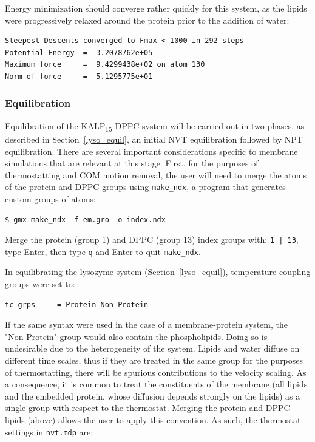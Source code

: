 \documentclass[9pt,tutorial,pubversion]{livecoms}
\begin{document}
Energy minimization should converge rather quickly for this system, as the lipids were progressively relaxed around the protein prior to the addition of water:

\begin{lstlisting}[basicstyle=\footnotesize\ttfamily]
Steepest Descents converged to Fmax < 1000 in 292 steps
Potential Energy  = -3.2078762e+05
Maximum force     =  9.4299438e+02 on atom 130
Norm of force     =  5.1295775e+01
\end{lstlisting}

\subsubsection{Equilibration} \label{kalp_equil}

Equilibration of the KALP\textsubscript{15}-DPPC system will be carried out in two phases, as described in Section~\ref{lyso_equil}, an initial NVT equilibration followed by NPT equilibration. There are several important considerations specific to membrane simulations that are relevant at this stage. First, for the purposes of thermostatting and COM motion removal, the user will need to merge the atoms of the protein and DPPC groups using \texttt{make\_ndx}, a program that generates custom groups of atoms:

\begin{lstlisting}
$ gmx make_ndx -f em.gro -o index.ndx
\end{lstlisting}
%
Merge the protein (group 1) and DPPC (group 13) index groups with: \texttt{1 | 13}, type Enter, then type \texttt{q} and Enter to quit \texttt{make\_ndx}.

In equilibrating the lysozyme system (Section~\ref{lyso_equil}), temperature coupling groups were set to:

\begin{lstlisting}
tc-grps     = Protein Non-Protein
\end{lstlisting}

If the same syntax were used in the case of a membrane-protein system, the "Non-Protein" group would also contain the phospholipids. Doing so is undesirable due to the heterogeneity of the system. Lipids and water diffuse on different time scales, thus if they are treated in the same group for the purposes of thermostatting, there will be spurious contributions to the velocity scaling. As a consequence, it is common to treat the constituents of the membrane (all lipids and the embedded protein, whose diffusion depends strongly on the lipids) as a single group with respect to the thermostat. Merging the protein and DPPC lipids (above) allows the user to apply this convention. As such, the thermostat settings in \texttt{nvt.mdp} are:
\end{document}
